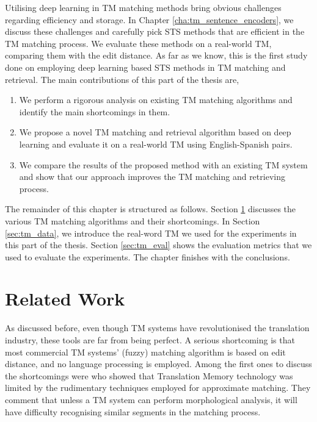 Utilising deep learning in TM matching methods bring obvious challenges regarding efficiency and storage. In Chapter \ref{cha:tm_sentence_encoders}, we discuss these challenges and carefully pick STS methods that are efficient in the TM matching process. We evaluate these methods on a real-world TM, comparing them with the edit distance. As far as we know, this is the first study done on employing deep learning based STS methods in TM matching and retrieval. The main contributions of this part of the thesis are, 

\begin{enumerate}
	\item We perform a rigorous analysis on existing TM matching algorithms and identify the main shortcomings in them.
	\item We propose a novel TM matching and retrieval algorithm based on deep learning and evaluate it on a real-world TM using English-Spanish pairs. 
	\item We compare the results of the proposed method with an existing TM system and show that our approach improves the TM matching and retrieving process.
\end{enumerate}

The remainder of this chapter is structured as follows. Section \ref{sec:tm_related} discusses the various TM matching algorithms and their shortcomings. In Section \ref{sec:tm_data}, we introduce the real-word TM we used for the experiments in this part of the thesis. Section \ref{sec:tm_eval} shows the evaluation metrics that we used to evaluate the experiments. The chapter finishes with the conclusions. 

\section{Related Work}
\label{sec:tm_related}
As discussed before, even though TM systems have revolutionised the translation industry, these tools are far from being perfect. A serious shortcoming is that most commercial TM systems' (fuzzy) matching algorithm is based on edit distance, and no language processing is employed. Among the first ones to discuss the shortcomings were \textcite{10.5555/648180.749379} who showed that Translation Memory technology was limited by the rudimentary techniques employed for approximate matching.  They comment that unless a TM system can perform morphological analysis, it will have difficulty recognising similar segments in the matching process.

